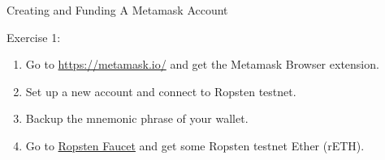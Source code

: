 \documentclass[handout]{beamer}
\begin{document}
\begin{frame}{Creating and Funding A Metamask Account}

	\begin{exercise}{Exercise 1:}
		\begin{enumerate}
			\item Go to \url{https://metamask.io/} and get the Metamask Browser extension.
			\item Set up a new account and connect to Ropsten testnet.
			\item Backup the mnemonic phrase of your wallet.
			\item Go to \link \href{https://faucet.ropsten.be/}{Ropsten Faucet} and get some Ropsten testnet Ether (rETH).
		\end{enumerate}
	\end{exercise}	
\end{frame}
\end{document}
